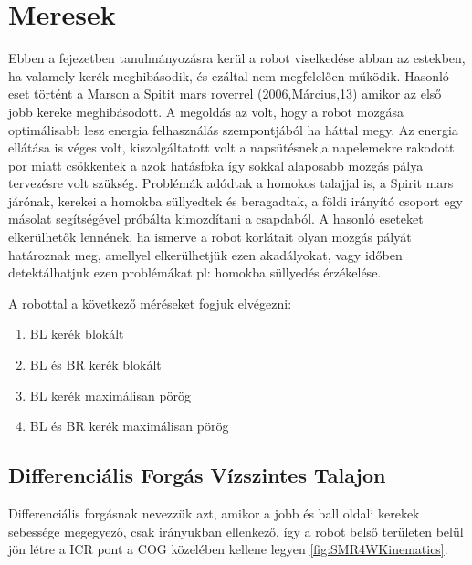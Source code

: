 \section{Meresek}
Ebben a fejezetben tanulmányozásra kerül a robot viselkedése abban az estekben, ha valamely kerék meghibásodik, és ezáltal nem megfelelően működik.
Hasonló eset történt a Marson a Spitit mars roverrel (2006,Március,13) \cite{SpititWheel1} amikor az első jobb kereke meghibásodott. A megoldás az volt, hogy a robot mozgása optimálisabb lesz energia felhasználás szempontjából ha háttal megy. Az energia ellátása is véges volt, kiszolgáltatott volt a napsütésnek,a napelemekre rakodott por miatt csökkentek a azok hatásfoka így sokkal alaposabb mozgás pálya tervezésre volt szükség.
Problémák adódtak a homokos talajjal is, a Spirit mars járónak, kerekei a homokba süllyedtek és beragadtak, a földi irányító csoport egy másolat segítségével próbálta kimozdítani a csapdaból.
A hasonló eseteket elkerülhetők lennének, ha ismerve a robot korlátait olyan mozgás pályát határoznak meg, amellyel elkerülhetjük ezen akadályokat, vagy időben detektálhatjuk ezen problémákat pl: homokba süllyedés érzékelése.


A robottal a következő méréseket fogjuk elvégezni:
\begin{enumerate}[label=(\alph*)]
\item BL kerék blokált
\item BL és BR kerék blokált
\item BL kerék maximálisan pörög
\item BL és BR kerék maximálisan pörög
\end{enumerate}


\subsection{Differenciális Forgás Vízszintes Talajon}

Differenciális forgásnak nevezzük azt, amikor a jobb és ball oldali kerekek sebessége megegyező, csak irányukban ellenkező, így a robot belső területen belül jön létre a ICR pont a COG közelében kellene legyen \ref{fig:SMR4WKinematics}. 










